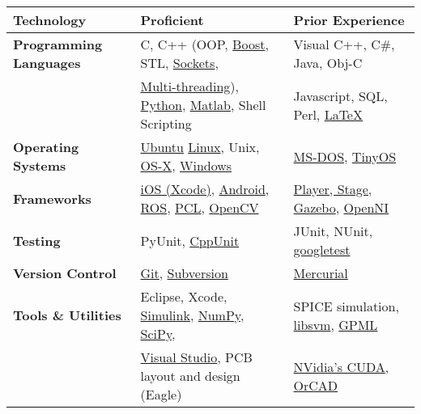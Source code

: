 \documentclass{res}
\begin{document}
\begin{resume}
\begin{table*}[h]
    \begin{tabular}{|lll|}
        \hline \bfseries Technology & \bfseries Proficient & \bfseries Prior Experience \\\hline 
        \hline \bfseries Programming Languages & C, C++ (OOP, \href{http://boost.org}{Boost}, STL, \href{http://beej.us/guide/bgnet/output/html/multipage/index.html}{Sockets},  & Visual C++, C\#, Java, Obj-C  \\
        & \href{https://computing.llnl.gov/tutorials/pthreads/}{Multi-threading}), \href{http://www.greenteapress.com/thinkpython/html/index.html}{Python}, \href{http://www.mathworks.com/}{Matlab}, Shell Scripting &  Javascript, SQL, Perl, \href{http://www.latex-project.org/}{\LaTeX} \\
        \hline \bfseries Operating Systems & \href{http://www.ubuntu.com/}{Ubuntu} \href{http://www.linux.org/}{Linux}, Unix, \href{https://developer.apple.com/}{OS-X}, \href{http://windows.microsoft.com/en-us/windows/home}{Windows} & \href{http://en.wikipedia.org/wiki/DOS}{MS-DOS}, \href{http://www.tinyos.net/}{TinyOS}  \\
        \hline \bfseries Frameworks & \href{https://developer.apple.com/devcenter/ios/index.action}{iOS (Xcode)}, \href{http://developer.android.com/index.html}{Android}, \href{http://www.ros.org/wiki/}{ROS}, \href{http://pointclouds.org/}{PCL}, \href{http://opencv.org/}{OpenCV} &  \href{http://playerstage.sourceforge.net/} {Player, Stage,} \href{http://gazebosim.org/}{Gazebo}, \href{http://www.openni.org/}{OpenNI}  \\
        \hline \bfseries Testing & PyUnit, \href{http://robotics.usc.edu/~ampereir/wordpress/?p=772}{CppUnit} & JUnit, NUnit, \href{https://code.google.com/p/googletest/}{googletest} \\
        \hline \bfseries Version Control & \href{http://robotics.usc.edu/~ampereir/wordpress/?p=487}{Git}, \href{http://subversion.apache.org/}{Subversion} &  \href{http://mercurial.selenic.com/}{Mercurial} \\
        \hline \bfseries Tools \& Utilities & Eclipse, Xcode, \href{http://www.mathworks.com/products/simulink/}{Simulink}, \href{http://www.numpy.org/}{NumPy}, \href{http://www.scipy.org/}{SciPy},  & SPICE simulation, \href{http://www.csie.ntu.edu.tw/~cjlin/libsvm/}{libsvm}, \href{http://www.gaussianprocess.org/gpml/code/matlab/doc/}{GPML} \\
           &  \href{http://www.microsoft.com/visualstudio/}{Visual Studio}, PCB layout and design (Eagle) & \href{https://developer.nvidia.com/category/zone/cuda-zone}{NVidia's CUDA}, \href{http://www.cadence.com/products/orcad/pages/default.aspx}{OrCAD} \\

\end{tabular}
\end{table*}
\end{resume}
\end{document}
